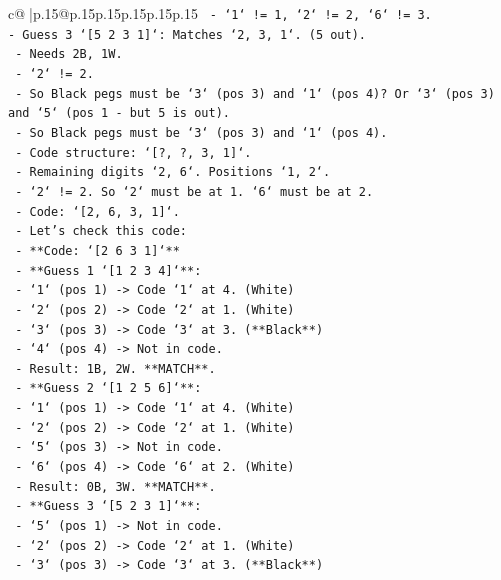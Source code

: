 \documentclass{article}
\begin{document}
{\begin{supertabular}{c@{$\;$}|p{.15\linewidth}@{}p{.15\linewidth}p{.15\linewidth}p{.15\linewidth}p{.15\linewidth}p{.15\linewidth}}
{{{\texttt{  {-} `1` != 1, `2` != 2, `6` != 3.} \\
\texttt{{-} Guess 3 `{[}5 2 3 1{]}`: Matches `2, 3, 1`. (5 out).} \\
\texttt{  {-} Needs 2B, 1W.} \\
\texttt{  {-} `2` != 2.} \\
\texttt{  {-} So Black pegs must be `3` (pos 3) and `1` (pos 4)? Or `3` (pos 3) and `5` (pos 1 {-} but 5 is out).} \\
\texttt{  {-} So Black pegs must be `3` (pos 3) and `1` (pos 4).} \\
\texttt{  {-} Code structure: `{[}?, ?, 3, 1{]}`.} \\
\texttt{  {-} Remaining digits `2, 6`. Positions `1, 2`.} \\
\texttt{  {-} `2` != 2. So `2` must be at 1. `6` must be at 2.} \\
\texttt{  {-} Code: `{[}2, 6, 3, 1{]}`.} \\
\texttt{  {-} Let's check this code:} \\
\texttt{    {-} **Code: `{[}2 6 3 1{]}`**} \\
\texttt{    {-} **Guess 1 `{[}1 2 3 4{]}`**:} \\
\texttt{      {-} `1` (pos 1) {-}> Code `1` at 4. (White)} \\
\texttt{      {-} `2` (pos 2) {-}> Code `2` at 1. (White)} \\
\texttt{      {-} `3` (pos 3) {-}> Code `3` at 3. (**Black**)} \\
\texttt{      {-} `4` (pos 4) {-}> Not in code.} \\
\texttt{      {-} Result: 1B, 2W. **MATCH**.} \\
\texttt{    {-} **Guess 2 `{[}1 2 5 6{]}`**:} \\
\texttt{      {-} `1` (pos 1) {-}> Code `1` at 4. (White)} \\
\texttt{      {-} `2` (pos 2) {-}> Code `2` at 1. (White)} \\
\texttt{      {-} `5` (pos 3) {-}> Not in code.} \\
\texttt{      {-} `6` (pos 4) {-}> Code `6` at 2. (White)} \\
\texttt{      {-} Result: 0B, 3W. **MATCH**.} \\
\texttt{    {-} **Guess 3 `{[}5 2 3 1{]}`**:} \\
\texttt{      {-} `5` (pos 1) {-}> Not in code.} \\
\texttt{      {-} `2` (pos 2) {-}> Code `2` at 1. (White)} \\
\texttt{      {-} `3` (pos 3) {-}> Code `3` at 3. (**Black**)} \\
}}}
\end{supertabular}}
\end{document}
